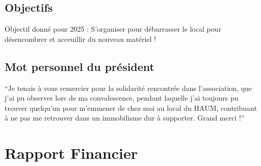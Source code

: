 \documentclass[a4paper, 11pt]{article}
\begin{document}
\begin{appendices}
\subsection{Objectifs}


Objectif donné pour 2025 : S'organiser pour débarrasser le local pour 
désencombrer et acceuillir du nouveau matériel !


\subsection{Mot personnel du président}

``Je tenais à vous remercier pour la solidarité rencontrée dans l'association,
que j'ai pu observer lors de ma convalescence, pendant laquelle j'ai toujours pu trouver
quelqu'un pour m'emmener de chez moi au local du HAUM, contribuant à ne pas me retrouver
dans un immobilisme dur à supporter. Grand merci !''

\section{Rapport Financier}
%
\end{appendices}
\end{document}
